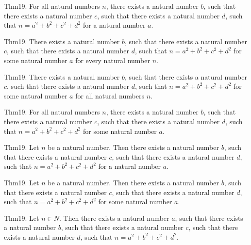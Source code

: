 \documentclass{article}
\begin{document}
Thm19. For all natural numbers $n$, there exists a natural number $b$, such that there exists a natural number $c$, such that there exists a natural number $d$, such that $n = a ^{ 2}+ b ^{ 2}+ c ^{ 2}+ d ^{ 2}$ for a natural number $a$.

Thm19. There exists a natural number $b$, such that there exists a natural number $c$, such that there exists a natural number $d$, such that $n = a ^{ 2}+ b ^{ 2}+ c ^{ 2}+ d ^{ 2}$ for some natural number $a$ for every natural number $n$.

Thm19. There exists a natural number $b$, such that there exists a natural number $c$, such that there exists a natural number $d$, such that $n = a ^{ 2}+ b ^{ 2}+ c ^{ 2}+ d ^{ 2}$ for some natural number $a$ for all natural numbers $n$.

Thm19. For all natural numbers $n$, there exists a natural number $b$, such that there exists a natural number $c$, such that there exists a natural number $d$, such that $n = a ^{ 2}+ b ^{ 2}+ c ^{ 2}+ d ^{ 2}$ for some natural number $a$.

Thm19. Let $n$ be a natural number. Then there exists a natural number $b$, such that there exists a natural number $c$, such that there exists a natural number $d$, such that $n = a ^{ 2}+ b ^{ 2}+ c ^{ 2}+ d ^{ 2}$ for a natural number $a$.

Thm19. Let $n$ be a natural number. Then there exists a natural number $b$, such that there exists a natural number $c$, such that there exists a natural number $d$, such that $n = a ^{ 2}+ b ^{ 2}+ c ^{ 2}+ d ^{ 2}$ for some natural number $a$.

Thm19. Let $n \in N$. Then there exists a natural number $a$, such that there exists a natural number $b$, such that there exists a natural number $c$, such that there exists a natural number $d$, such that $n = a ^{ 2}+ b ^{ 2}+ c ^{ 2}+ d ^{ 2}$.
\end{document}
